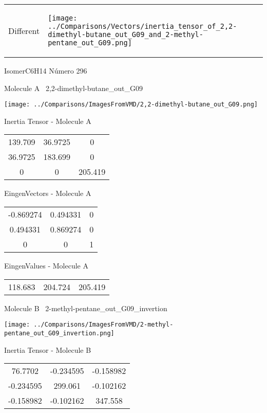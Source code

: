 \vtab[-5mm]
\begin{tabular}{*{2}{m{}}}
\begin{center}
\textcolor{NavyBlue}{\Large Different}
\end{center}
&
\begin{center}
\texttt{[image: ../Comparisons/Vectors/inertia\_tensor\_of\_2,2-dimethyl-butane\_out\_G09\_and\_2-methyl-pentane\_out\_G09.png]}
\end{center}
\end{tabular}

 \newpage

\vtab[-3cm]
\begin{center}
{\large IsomerC6H14 \tab Número 296}
\end{center}
\begin{multicols}{2}
\begin{center}

Molecule A \
2,2-dimethyl-butane\_out\_G09

\texttt{[image: ../Comparisons/ImagesFromVMD/2,2-dimethyl-butane\_out\_G09.png]}

Inertia Tensor - Molecule A \\
\begin{tabular}{|c c c|}
139.709	 & 	36.9725	 & 	0	 \\
36.9725	 & 	183.699	 & 	0	 \\
0	 & 	0	 & 	205.419
\end{tabular}

\vtab
 EingenVectors - Molecule A     \\
\begin{tabular}{|c c c|}
-0.869274	 & 	0.494331	 & 	0	 \\
0.494331	 & 	0.869274	 & 	0	 \\
0	 & 	0	 & 	1
\end{tabular}

\vtab
 EingenValues - Molecule A     \\
\begin{tabular}{|c c c|}
118.683	 & 	204.724	 & 	205.419	 \\
\end{tabular}
\columnbreak

Molecule B \
2-methyl-pentane\_out\_G09\_invertion

\texttt{[image: ../Comparisons/ImagesFromVMD/2-methyl-pentane\_out\_G09\_invertion.png]}

Inertia Tensor - Molecule B \\
\begin{tabular}{|c c c|}
76.7702	 & 	-0.234595	 & 	-0.158982	 \\
-0.234595	 & 	299.061	 & 	-0.102162	 \\
-0.158982	 & 	-0.102162	 & 	347.558
\end{tabular}


\end{center}
\end{multicols}
